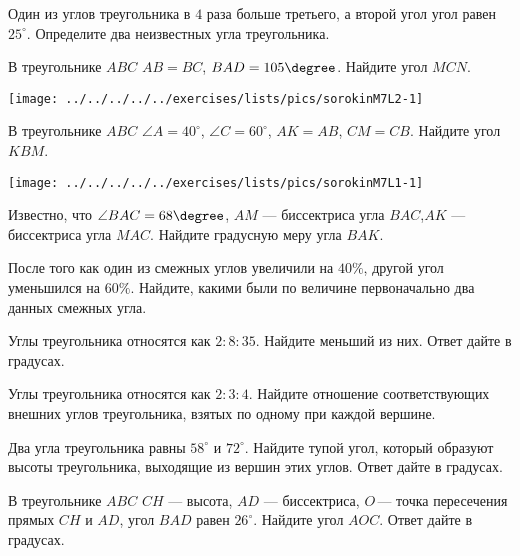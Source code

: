 \begin{class}[number=2]
	\begin{listofex}
		\item Один из углов треугольника в \( 4 \) раза больше третьего, а второй угол угол равен \(  25^{\circ} \). Определите два неизвестных угла треугольника.
		\item 
		\begin{minipage}[t]{\bodywidth}
			В треугольнике \( ABC \)  \( AB = BC \), \( BAD=105\degree \). Найдите угол \( MCN \).
		\end{minipage}
		\hspace{0.02\linewidth}
		\begin{minipage}[t]{\picwidth}
			\texttt{[image: ../../../../../exercises/lists/pics/sorokinM7L2-1]}
		\end{minipage} 
		\item 
		\begin{minipage}[t]{\bodywidth}
			В треугольнике \( ABC \) \( \angle A = 40^{\circ} \), \( 
			\angle C = 60^{\circ} \), \( AK = AB \), \( CM = CB \). Найдите угол \( KBM \).
		\end{minipage}
		\hspace{0.02\linewidth}
		\begin{minipage}[t]{\picwidth}
			\texttt{[image: ../../../../../exercises/lists/pics/sorokinM7L1-1]}
		\end{minipage} 
		\item Известно, что  \( \angle BAC = 68\degree \), \( AM \) — биссектриса угла \( BAC \),\( AK \) — биссектриса угла \(  MAC \). Найдите градусную меру угла \( BAK \).
		\item После того как один из смежных углов увеличили на \( 40\% \), другой угол уменьшился на \( 60 \% \). Найдите, какими были по величине первоначально два данных смежных угла.
		\item Углы треугольника относятся как \(  2:8:35 \). Найдите меньший из них. Ответ дайте в градусах.
		\item Углы треугольника относятся как \( 2:3:4 \). Найдите отношение соответствующих внешних углов треугольника,
		взятых по одному при каждой вершине.
		\item Два угла треугольника равны \( 58^{\circ} \) и \( 72^{\circ} \). Найдите тупой угол, который образуют высоты треугольника, выходящие из вершин этих углов. Ответ дайте в градусах.
		\item В треугольнике \( ABC \) \( CH \)  — высота, \( AD \)  — биссектриса, \( O \) — точка пересечения прямых \( CH \) и \( AD \), угол \( BAD \) равен \( 26^{\circ} \). Найдите угол \( AOC \). Ответ дайте в градусах.

\end{listofex}
\end{class}
